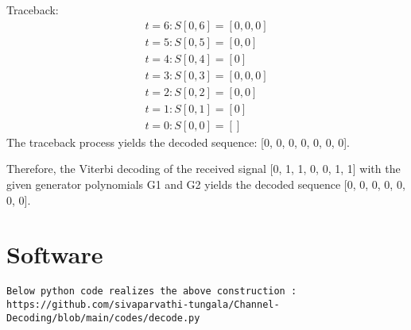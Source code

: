 Traceback:
\begin{align}
t = 6: S[0, 6] = [0, 0, 0]\\
t = 5: S[0, 5] = [0, 0]\\
t = 4: S[0, 4] = [0]\\
t = 3: S[0, 3] = [0, 0, 0]\\
t = 2: S[0, 2] = [0, 0]\\
t = 1: S[0, 1] = [0]\\
t = 0: S[0, 0] = []
\end{align}
The traceback process yields the decoded sequence: [0, 0, 0, 0, 0, 0, 0].

Therefore, the Viterbi decoding of the received signal [0, 1, 1, 0, 0, 1, 1] with the given generator polynomials G1 and G2 yields the decoded sequence [0, 0, 0, 0, 0, 0, 0].
\section{Software}
\begin{center}
 \begin{lstlisting}
Below python code realizes the above construction :
https://github.com/sivaparvathi-tungala/Channel-Decoding/blob/main/codes/decode.py
 \end{lstlisting}
\end{center}

